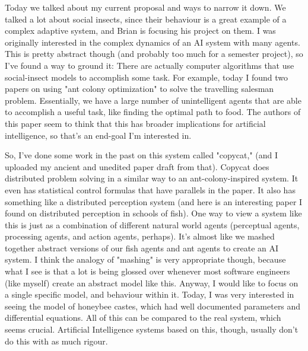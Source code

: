 \documentclass{nature}
\begin{document}

Today we talked about my current proposal and ways to narrow it down. We talked a lot about social insects, since their behaviour is a great example of a complex adaptive system, and Brian is focusing his project on them. I was originally interested in the complex dynamics of an AI system with many agents. This is pretty abstract though (and probably too much for a semester project), so I've found a way to ground it: There are actually computer algorithms that use social-insect models to accomplish some task. For example, today I found two papers on using "ant colony optimization" to solve the travelling salesman problem. Essentially, we have a large number of unintelligent agents that are able to accomplish a useful task, like finding the optimal path to food. The authors of this paper seem to think that this has broader implications for artificial intelligence, so that's an end-goal I'm interested in.

So, I've done some work in the past on this system called "copycat," (and I uploaded my ancient and unedited paper draft from that). Copycat does distributed problem solving in a similar way to an ant-colony-inspired system. It even has statistical control formulas that have parallels in the paper. It also has something like a distributed perception system (and here is an interesting paper I found on distributed perception in schools of fish). One way to view a system like this is just as a combination of different natural world agents (perceptual agents, processing agents, and action agents, perhaps). It's almost like we mashed together abstract versions of our fish agents and ant agents to create an AI system. I think the analogy of "mashing" is very appropriate though, because what I see is that a lot is being glossed over whenever most software engineers (like myself) create an abstract model like this. Anyway, I would like to focus on a single specific model, and behaviour within it. Today, I was very interested in seeing the model of honeybee castes, which had well documented parameters and differential equations. All of this can be compared to the real system, which seems crucial. Artificial Intelligence systems based on this, though, usually don't do this with as much rigour.
\end{document}
